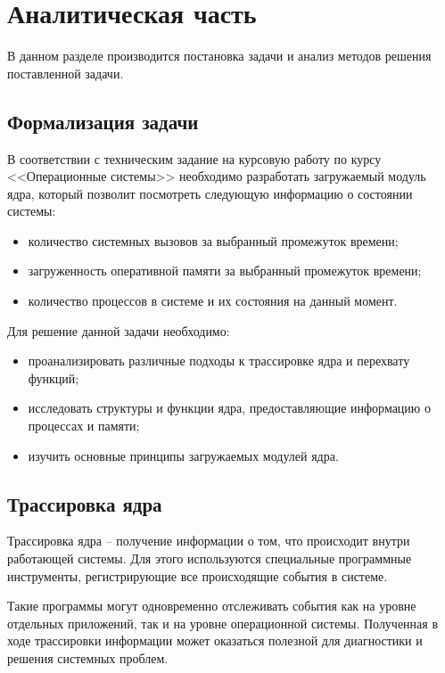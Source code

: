 \chapter{Аналитическая часть}

В данном разделе производится постановка задачи и анализ методов решения поставленной задачи.

\section{Формализация задачи}

В соответствии с техническим задание на курсовую работу по курсу <<Операционные системы>> необходимо разработать загружаемый модуль ядра, который позволит посмотреть следующую информацию о состоянии системы:

\begin{itemize}
	\item количество системных вызовов за выбранный промежуток времени;
	\item загруженность оперативной памяти за выбранный промежуток времени;
	\item количество процессов в системе и их состояния на данный момент.
\end{itemize}

Для решение данной задачи необходимо:

\begin{itemize}
	\item проанализировать различные подходы к трассировке ядра  и перехвату функций;
	\item исследовать структуры и функции ядра, предоставляющие информацию о процессах и памяти;
	\item изучить основные принципы загружаемых модулей ядра.
\end{itemize}

\section{Трассировка ядра}

Трассировка ядра -- получение информации о том, что происходит внутри работающей системы. Для этого используются специальные программные инструменты, регистрирующие все происходящие события в системе.

Такие программы могут одновременно отслеживать события как на уровне отдельных приложений, так и на уровне операционной системы. Полученная в ходе трассировки информации может оказаться полезной для диагностики и решения системных проблем.

